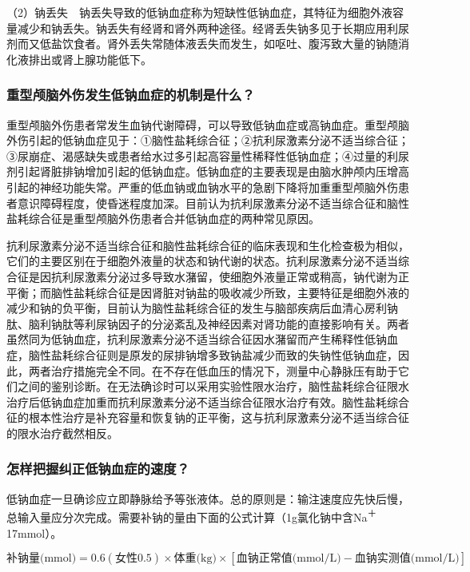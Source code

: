 （2）钠丢失　钠丢失导致的低钠血症称为短缺性低钠血症，其特征为细胞外液容量减少和钠丢失。钠丢失有经肾和肾外两种途径。经肾丢失钠多见于长期应用利尿剂而又低盐饮食者。肾外丢失常随体液丢失而发生，如呕吐、腹泻致大量的钠随消化液排出或肾上腺功能低下。

\subsubsection{重型颅脑外伤发生低钠血症的机制是什么？}

重型颅脑外伤患者常发生血钠代谢障碍，可以导致低钠血症或高钠血症。重型颅脑外伤引起的低钠血症见于：①脑性盐耗综合征；②抗利尿激素分泌不适当综合征；③尿崩症、渴感缺失或患者给水过多引起高容量性稀释性低钠血症；④过量的利尿剂引起肾脏排钠增加引起的低钠血症。低钠血症的主要表现是由脑水肿颅内压增高引起的神经功能失常。严重的低血钠或血钠水平的急剧下降将加重重型颅脑外伤患者意识障碍程度，使昏迷程度加深。目前认为抗利尿激素分泌不适当综合征和脑性盐耗综合征是重型颅脑外伤患者合并低钠血症的两种常见原因。

抗利尿激素分泌不适当综合征和脑性盐耗综合征的临床表现和生化检查极为相似，它们的主要区别在于细胞外液量的状态和钠代谢的状态。抗利尿激素分泌不适当综合征是因抗利尿激素分泌过多导致水潴留，使细胞外液量正常或稍高，钠代谢为正平衡；而脑性盐耗综合征是因肾脏对钠盐的吸收减少所致，主要特征是细胞外液的减少和钠的负平衡，目前认为脑性盐耗综合征的发生与脑部疾病后血清心房利钠肽、脑利钠肽等利尿钠因子的分泌紊乱及神经因素对肾功能的直接影响有关。两者虽然同为低钠血症，抗利尿激素分泌不适当综合征因水潴留而产生稀释性低钠血症，脑性盐耗综合征则是原发的尿排钠增多致钠盐减少而致的失钠性低钠血症，因此，两者治疗措施完全不同。在不存在低血压的情况下，测量中心静脉压有助于它们之间的鉴别诊断。在无法确诊时可以采用实验性限水治疗，脑性盐耗综合征限水治疗后低钠血症加重而抗利尿激素分泌不适当综合征限水治疗有效。脑性盐耗综合征的根本性治疗是补充容量和恢复钠的正平衡，这与抗利尿激素分泌不适当综合征的限水治疗截然相反。

\subsubsection{怎样把握纠正低钠血症的速度？}

低钠血症一旦确诊应立即静脉给予等张液体。总的原则是：输注速度应先快后慢，总输入量应分次完成。需要补钠的量由下面的公式计算（1g氯化钠中含Na\textsuperscript{＋}
17mmol）。

\[
\text{补钠量(mmol)}=0.6(\text{女性}0.5)\times \text{体重(kg)}\times[\text{血钠正常值(mmol/L)}-\text{血钠实测值(mmol/L)}]    
\]

